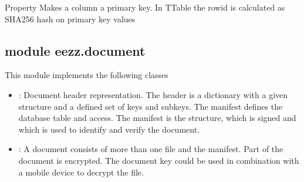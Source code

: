 \documentclass[letterpaper,10pt,english]{sphinxmanual}
\begin{document}
\begin{savenotes}
\begin{fulllineitems}
\begin{savenotes}
\begin{fulllineitems}
\end{fulllineitems}\end{savenotes}


\begin{savenotes}\begin{fulllineitems}
\label{\detokenize{eezz:eezz.database.TDatabaseColumn.primary_key}}
\pysigstartsignatures
{}
\pysigstopsignatures
\sphinxAtStartPar
Property \sphinxhyphen{} Makes a column a primary key. In TTable the row\sphinxhyphen{}id is calculated as SHA256 hash on primary key values

\end{fulllineitems}\end{savenotes}


\end{fulllineitems}\end{savenotes}



\subsection{module eezz.document}
\label{\detokenize{eezz:module-eezz.document}}\label{\detokenize{eezz:module-eezz-document}}
\sphinxAtStartPar
This module implements the following classes
\begin{itemize}
\item {} 
\sphinxAtStartPar
{}:   Document header representation. The header is a dictionary with a given     structure and a defined set of keys and sub\sphinxhyphen{}keys. The manifest defines the database table and access.     The manifest is the structure, which is signed and which is used to identify and verify the document.

\item {} 
\sphinxAtStartPar
{}:  A document consists of more than one file and the manifest. Part of the     document is encrypted. The document key could be used in combination with a mobile device to decrypt the file.

\end{itemize}
\end{document}
